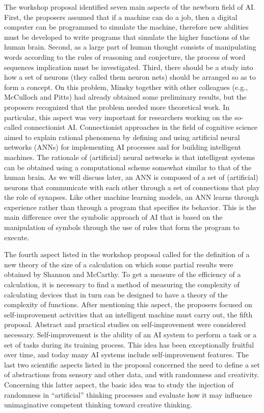 The workshop proposal identified seven main aspects of the newborn field of AI. First, the proposers assumed that if a machine can do a job, then a digital computer can be programmed to simulate the machine, therefore new abilities must be developed to write programs that simulate the higher functions of the human brain. Second, as a large part of human thought consists of manipulating words according to the rules of reasoning and conjecture, the process of word sequences implication must be investigated. Third, there should be a study into how a set of neurons (they called them neuron nets) should be arranged so as to form a concept. On this problem, Minsky together with other colleagues (e.g., McCulloch and Pitts) had already obtained some preliminary results, but the proposers recognized that the problem needed more theoretical work. In particular, this aspect was very important for researchers working on the so-called connectionist AI. Connectionist approaches in the field of cognitive science aimed to explain rational phenomena by defining and using artificial neural networks (ANNs) for implementing AI processes and for building intelligent machines. The rationale of (artificial) neural networks is that intelligent systems can be obtained using a computational scheme somewhat similar to that of the human brain. As we will discuss later, an ANN is composed of a set of (artificial) neurons that communicate with each other through a set of connections that play the role of synapses. Like other machine learning models, an ANN learns through experience rather than through a program that specifies its behavior. This is the main difference over the symbolic approach of AI that is based on the manipulation of symbols through the use of rules that form the program to execute.

The fourth aspect listed in the workshop proposal called for the definition of a new theory of the size of a calculation on which some partial results were obtained by Shannon and McCarthy. To get a measure of the efficiency of a calculation, it is necessary to find a method of measuring the complexity of calculating devices that in turn can be designed to have a theory of the complexity of functions. After mentioning this aspect, the proposers focused on self-improvement activities that an intelligent machine must carry out, the fifth proposal. Abstract and practical studies on self-improvement were considered necessary. Self-improvement is the ability of an AI system to perform a task or a set of tasks during its training process. This idea has been exceptionally fruitful over time, and today many AI systems include self-improvement features. The last two scientific aspects listed in the proposal concerned the need to define a set of abstractions from sensory and other data, and with randomness and creativity. Concerning this latter aspect, the basic idea was to study the injection of randomness in ``artificial'' thinking processes and evaluate how it may influence unimaginative competent thinking toward creative thinking.

